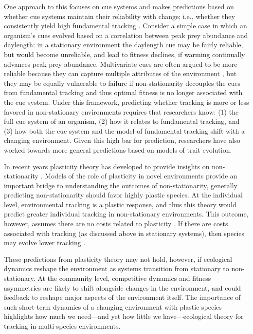 \documentclass[11pt,letterpaper]{article}
\newcommand{\R}[1]{\label{}\linelabel{#1}}
\begin{document}
One approach to this focuses on cue systems and makes predictions based on whether cue systems maintain their reliability with change; i.e., whether they consistently yield high fundamental tracking \citep{bonamour2019}. Consider a simple case in which an organism's cues evolved based on a correlation between peak prey abundance and daylength: in a stationary environment the daylength cue may be fairly reliable, but would become unreliable, and lead to fitness declines, if warming continually advances peak prey abundance. Multivariate cues are often argued to be more reliable because they can capture multiple attributes of the environment \citep{dore2018,bonamour2019}, but they may be equally vulnerable to failure if non-stationarity decouples the cues from fundamental tracking \citep{bonamour2019} and thus optimal fitness is no longer associated with the cue system. Under this framework, predicting whether tracking is more or less favored in non-stationary environments requires that researchers know: (1) the full cue system of an organism, (2) how it relates to fundamental tracking, and (3) how both the cue system and the \R{r2whatmodel}model of fundamental tracking shift with a changing environment. Given this high bar for prediction, researchers have also worked towards more general predictions based on models of trait evolution.

In recent years plasticity theory has developed to provide insights on non-stationarity \citep[or `sustained environmental change,' see][]{chevin2010}. Models of the role of plasticity in novel environments provide an important bridge to understanding the outcomes of non-stationarity, generally predicting non-stationarity should favor highly plastic species. At the individual level, environmental tracking is a plastic response, and thus this theory would predict greater individual tracking in non-stationary environments. This outcome, however, assumes there are no costs related to plasticity \citep{Ghalambor2007,tufto2015}. If there are costs associated with tracking (as discussed above in stationary systems), then species may evolve lower tracking \citep{auld2010}.

\R{r2expand}These predictions from plasticity theory may not hold, however, if ecological dynamics reshape the environment as systems transition from stationary to non-stationary. At the community level, competitive dynamics and fitness asymmetries are likely to shift alongside changes in the environment, and could feedback to reshape major aspects of the environment itself. The importance of such short-term dynamics of a changing environment with plastic species highlights how much we need---and yet how little we have---ecological theory for tracking in multi-species environments.\R{r2expandend}
\end{document}
